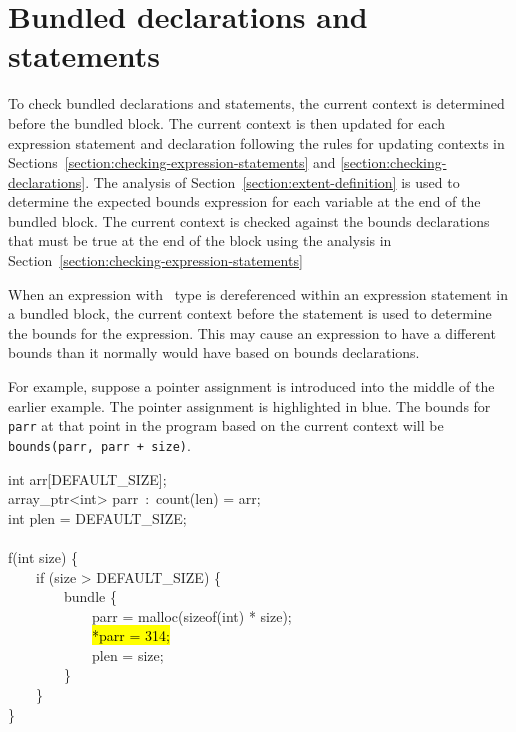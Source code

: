 \section{Bundled declarations and statements}
\label{section:checking-bundled}

To check bundled declarations and statements, the current context is
determined before the bundled block. The current context is then updated
for each expression statement and declaration following the rules for
updating contexts in Sections~\ref{section:checking-expression-statements} and 
\ref{section:checking-declarations}. The analysis of 
Section~\ref{section:extent-definition}
is used to determine the expected bounds expression for each variable at
the end of the bundled block. The current context is checked against the
bounds declarations that must be true at the end of the block using the
analysis in Section~\ref{section:checking-expression-statements}

When an expression with \arrayptr\ type is dereferenced within
an expression statement in a bundled block, the current context before
the statement is used to determine the bounds for the expression. This
may cause an expression to have a different bounds than it normally
would have based on bounds declarations.

For example, suppose a pointer assignment is introduced into the middle
of the earlier example. The pointer assignment is highlighted in blue.
The bounds for \verb|parr| at that point in the program based on the
current context will be \verb|bounds(parr, parr + size)|.

\begin{tt}
int arr[DEFAULT\_SIZE];\\
array\_ptr<int> parr~:~count(len) = arr;\\
int plen = DEFAULT\_SIZE;\\
\\
f(int size) \{\\
\mbox{~~~~}if (size > DEFAULT\_SIZE) \{\\
\mbox{~~~~~~~~}bundle \{\\
\mbox{~~~~~~~~~~~~}parr = malloc(sizeof(int) * size);\\
\mbox{~~~~~~~~~~~~}\hl{*parr = 314;}\\
\mbox{~~~~~~~~~~~~}plen = size;\\
\mbox{~~~~~~~~}\}\\
\mbox{~~~~}\}\\
\}
\end{tt}

